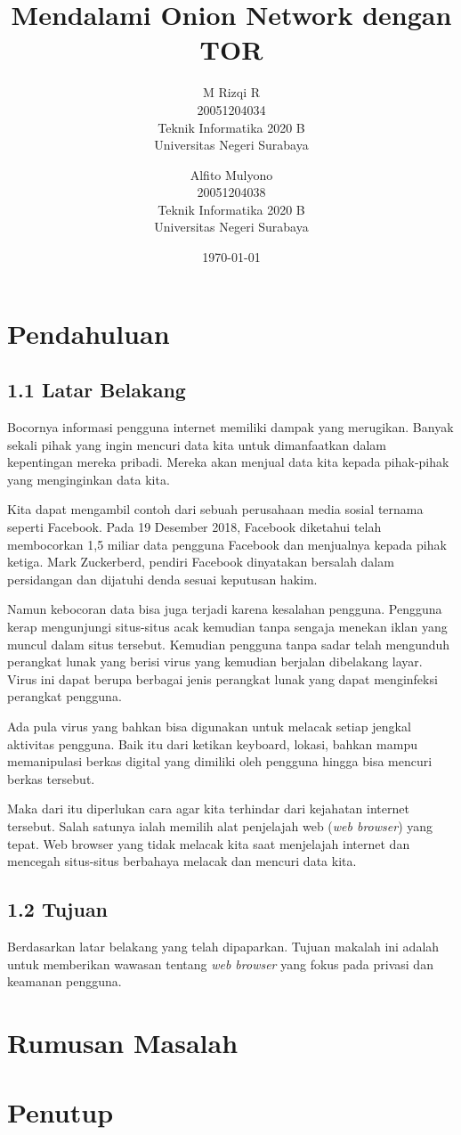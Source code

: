 \documentclass{article}
\title{\LARGE \textbf {\huge{Mendalami Onion Network dengan TOR}}}
\author{
    M Rizqi R\\
    20051204034\\
    Teknik Informatika 2020 B\\
    Universitas Negeri Surabaya\\
    \and
        Alfito Mulyono\\
        20051204038\\
        Teknik Informatika 2020 B\\
        Universitas Negeri Surabaya\\
}
\date{\today}
\begin{document}
    \maketitle
        \section{Pendahuluan}
        \subsection*{1.1 Latar Belakang}
        Bocornya informasi pengguna internet memiliki dampak yang merugikan.
        Banyak sekali pihak yang ingin mencuri data kita untuk 
        dimanfaatkan dalam kepentingan mereka pribadi. Mereka akan menjual 
        data kita kepada pihak-pihak yang menginginkan data kita.

        Kita dapat mengambil contoh dari sebuah perusahaan media sosial ternama
        seperti Facebook. Pada 19 Desember 2018, Facebook diketahui telah
        membocorkan 1,5 miliar data pengguna Facebook dan menjualnya kepada pihak ketiga.
        Mark Zuckerberd, pendiri Facebook dinyatakan bersalah dalam persidangan 
        dan dijatuhi denda sesuai keputusan hakim.

        Namun kebocoran data bisa juga terjadi karena kesalahan pengguna.
        Pengguna kerap mengunjungi situs-situs acak kemudian tanpa
        sengaja menekan iklan yang muncul dalam situs tersebut. 
        Kemudian pengguna tanpa sadar telah mengunduh perangkat
        lunak yang berisi virus yang kemudian berjalan dibelakang layar.
        Virus ini dapat berupa berbagai jenis perangkat lunak yang dapat
        menginfeksi perangkat pengguna.

        Ada pula virus yang bahkan bisa digunakan untuk melacak setiap jengkal
        aktivitas pengguna. Baik itu dari ketikan keyboard, lokasi, bahkan mampu memanipulasi
        berkas digital yang dimiliki oleh pengguna hingga bisa mencuri berkas tersebut.

        Maka dari itu diperlukan cara agar kita terhindar dari kejahatan internet tersebut.
        Salah satunya ialah memilih alat penjelajah web (\textit{web browser}) yang tepat.
        Web browser yang tidak melacak kita saat menjelajah internet dan mencegah
        situs-situs berbahaya melacak dan mencuri data kita.
        \subsection*{1.2 Tujuan}
        Berdasarkan latar belakang yang telah dipaparkan. Tujuan makalah ini adalah
        untuk memberikan wawasan tentang \textit{web browser} yang fokus pada 
        privasi dan keamanan pengguna.

        \section{Rumusan Masalah}
        \section{Penutup}
\end{document}
